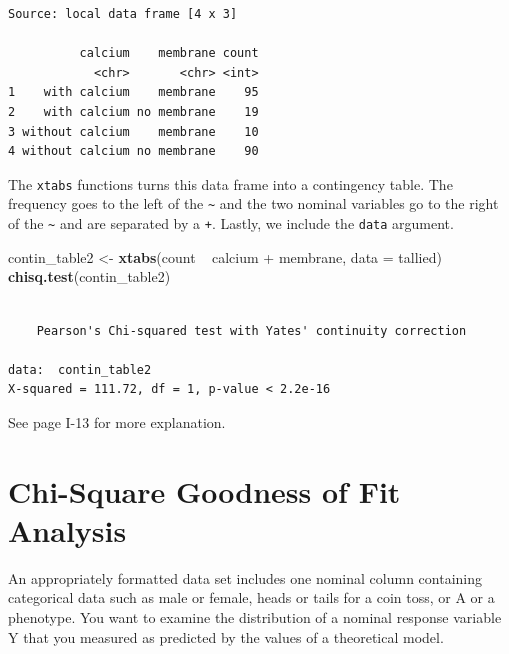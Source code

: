 \documentclass[twoside, 12pt]{article}
\newenvironment{Shaded}{\begin{snugshade}}{\end{snugshade}}
\newcommand{\KeywordTok}[1]{\textcolor[rgb]{0.13,0.29,0.53}{\textbf{{#1}}}}
\newcommand{\DataTypeTok}[1]{\textcolor[rgb]{0.13,0.29,0.53}{{#1}}}
\newcommand{\StringTok}[1]{\textcolor[rgb]{0.31,0.60,0.02}{{#1}}}
\newcommand{\NormalTok}[1]{{#1}}
\begin{document}
\begin{Verbatim}[frame=single]
Source: local data frame [4 x 3]

          calcium    membrane count
            <chr>       <chr> <int>
1    with calcium    membrane    95
2    with calcium no membrane    19
3 without calcium    membrane    10
4 without calcium no membrane    90
\end{Verbatim}

The \texttt{xtabs} functions turns this data frame into a contingency
table. The frequency goes to the left of the \texttt{\textasciitilde{}}
and the two nominal variables go to the right of the
\texttt{\textasciitilde{}} and are separated by a \texttt{+}. Lastly, we
include the \texttt{data} argument.

\begin{Shaded}
\begin{Highlighting}[]
\NormalTok{contin_table2 <-}\StringTok{ }\KeywordTok{xtabs}\NormalTok{(count ~}\StringTok{ }\NormalTok{calcium +}\StringTok{ }\NormalTok{membrane, }\DataTypeTok{data =} \NormalTok{tallied)}
\KeywordTok{chisq.test}\NormalTok{(contin_table2)}
\end{Highlighting}
\end{Shaded}

\begin{Verbatim}[frame=single]

    Pearson's Chi-squared test with Yates' continuity correction

data:  contin_table2
X-squared = 111.72, df = 1, p-value < 2.2e-16
\end{Verbatim}

See page I-13 for more explanation.

\section{Chi-Square Goodness of Fit
Analysis}\label{chi-square-goodness-of-fit-analysis}

An appropriately formatted data set includes one nominal column
containing categorical data such as male or female, heads or tails for a
coin toss, or A or a phenotype. You want to examine the distribution of
a nominal response variable Y that you measured as predicted by the
values of a theoretical model.
\end{document}
